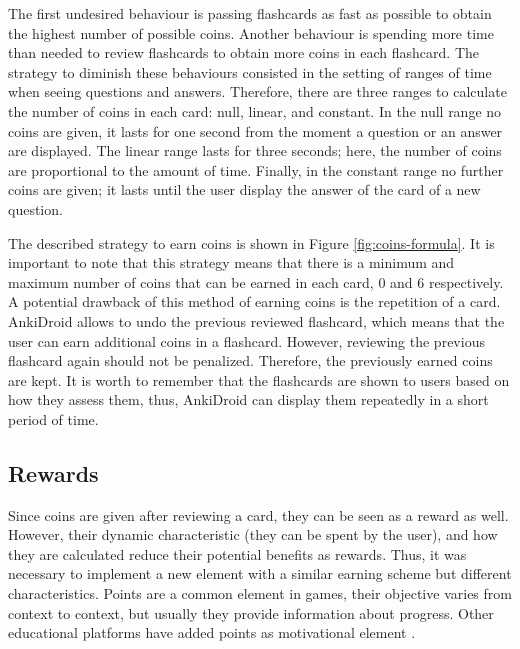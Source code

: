 The first undesired behaviour is passing flashcards as fast as possible to obtain the highest number of possible coins. Another behaviour is spending more time than needed to review flashcards to obtain more coins in each flashcard. The strategy to diminish these behaviours consisted in the setting of ranges of time when seeing questions and answers. Therefore, there are three ranges to calculate the number of coins in each card: null, linear, and constant. In the null range no coins are given, it lasts for one second from the moment a question or an answer are displayed. The linear range lasts for three seconds; here, the number of coins are proportional to the amount of time. Finally, in the constant range no further coins are given; it lasts until the user display the answer of the card of a new question.

The described strategy to earn coins is shown in Figure \ref{fig:coins-formula}. It is important to note that this strategy means that there is a minimum and maximum number of coins that can be earned in each card, 0 and 6 respectively. A potential drawback of this method of earning coins is the repetition of a card. AnkiDroid allows to undo the previous reviewed flashcard, which means that the user can earn additional coins in a flashcard. However, reviewing the previous flashcard again should not be penalized. Therefore, the previously earned coins are kept. It is worth to remember that the flashcards are shown to users based on how they assess them, thus, AnkiDroid can display them repeatedly in a short period of time.

\subsection{Rewards}
Since coins are given after reviewing a card, they can be seen as a reward as well. However, their dynamic characteristic (they can be spent by the user), and how they are calculated reduce their potential benefits as rewards. Thus, it was necessary to implement a new element with a similar earning scheme but different characteristics. Points are a common element in games, their objective varies from context to context, but usually they provide information about progress. Other educational platforms have added points as motivational element \citep{disalvo2014khan}.

